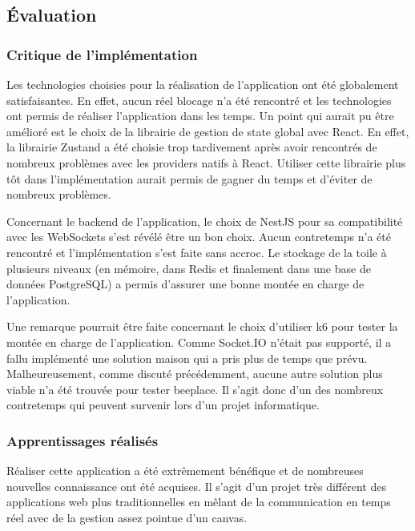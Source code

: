 \subsection{Évaluation}


\subsubsection{Critique de l'implémentation}

Les technologies choisies pour la réalisation de l'application ont été globalement satisfaisantes. En effet, aucun réel blocage n'a été rencontré et les technologies ont permis de réaliser l'application dans les temps. Un point qui aurait pu être amélioré est le choix de la librairie de gestion de state global avec React. En effet, la librairie Zustand a été choisie trop tardivement après avoir rencontrés de nombreux problèmes avec les providers natifs à React. Utiliser cette librairie plus tôt dans l'implémentation aurait permis de gagner du temps et d'éviter de nombreux problèmes.

Concernant le backend de l'application, le choix de NestJS pour sa compatibilité avec les WebSockets s'est révélé être un bon choix. Aucun contretemps n'a été rencontré et l'implémentation s'est faite sans accroc. Le stockage de la toile à plusieurs niveaux (en mémoire, dans Redis et finalement dans une base de données PostgreSQL) a permis d'assurer une bonne montée en charge de l'application.

Une remarque pourrait être faite concernant le choix d'utiliser k6 pour tester la montée en charge de l'application. Comme Socket.IO n'était pas supporté, il a fallu implémenté une solution maison qui a pris plus de temps que prévu. Malheureusement, comme discuté précédemment, aucune autre solution plus viable n'a été trouvée pour tester \gls{beeplace}. Il s'agit donc d'un des nombreux contretemps qui peuvent survenir lors d'un projet informatique.

\subsubsection{Apprentissages réalisés}

Réaliser cette application a été extrêmement bénéfique et de nombreuses nouvelles connaissance ont été acquises. Il s'agit d'un projet très différent des applications web plus traditionnelles en mêlant de la communication en temps réel avec de la gestion assez pointue d'un canvas.

